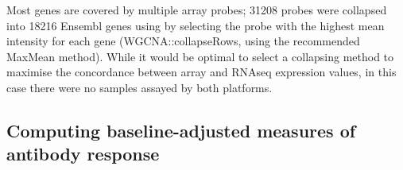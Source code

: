 Most genes are covered by multiple array probes; 31208 probes were collapsed into 18216 Ensembl genes using by selecting the probe with the highest mean intensity for each gene (WGCNA::collapseRows, using the recommended MaxMean method)\autocite{miller2011StrategiesAggregatingGene}.
While it would be optimal to select a collapsing method to maximise the concordance between array and \gls{RNAseq} expression values, in this case there were no samples assayed by both platforms.

%

\subsection{Computing baseline-adjusted measures of antibody response}


